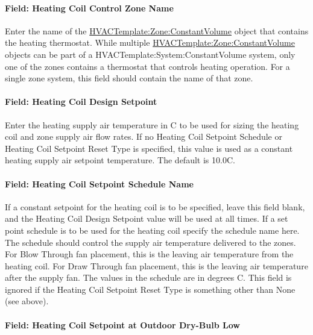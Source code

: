 \paragraph{Field: Heating Coil Control Zone Name}\label{field-heating-coil-control-zone-name}

Enter the name of the \hyperref[hvactemplatezoneconstantvolume]{HVACTemplate:Zone:ConstantVolume} object that contains the heating thermostat. While multiple \hyperref[hvactemplatezoneconstantvolume]{HVACTemplate:Zone:ConstantVolume} objects can be part of a HVACTemplate:System:ConstantVolume system, only one of the zones contains a thermostat that controls heating operation. For a single zone system, this field should contain the name of that zone.

\paragraph{Field: Heating Coil Design Setpoint}\label{field-heating-coil-design-setpoint-3}

Enter the heating supply air temperature in C to be used for sizing the heating coil and zone supply air flow rates. If no Heating Coil Setpoint Schedule or Heating Coil Setpoint Reset Type is specified, this value is used as a constant heating supply air setpoint temperature. The default is 10.0C.

\paragraph{Field: Heating Coil Setpoint Schedule Name}\label{field-heating-coil-setpoint-schedule-name-2}

If a constant setpoint for the heating coil is to be specified, leave this field blank, and the Heating Coil Design Setpoint value will be used at all times. If a set point schedule is to be used for the heating coil specify the schedule name here. The schedule should control the supply air temperature delivered to the zones. For Blow Through fan placement, this is the leaving air temperature from the heating coil. For Draw Through fan placement, this is the leaving air temperature after the supply fan. The values in the schedule are in degrees C. This field is ignored if the Heating Coil Setpoint Reset Type is something other than None (see above).

\paragraph{Field: Heating Coil Setpoint at Outdoor Dry-Bulb Low}\label{field-heating-coil-setpoint-at-outdoor-dry-bulb-low}

